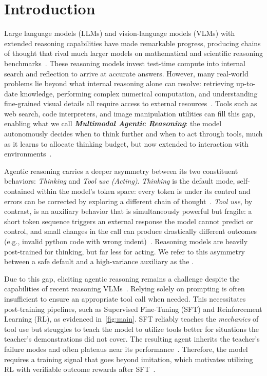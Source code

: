 \section{Introduction}
\label{sec:intro}

Large language models (LLMs) and vision-language models (VLMs) with extended reasoning capabilities have made remarkable progress, producing chains of thought that rival much larger models on mathematical and scientific reasoning benchmarks~\citep{r1, o1, s1}.
These reasoning models invest test-time compute into internal search and reflection to arrive at accurate answers.
However, many real-world problems lie beyond what internal reasoning alone can resolve: retrieving up-to-date knowledge, performing complex numerical computation, and understanding fine-grained visual details all require access to external resources~\citep{Search-R1, Search-o1, PoT, mini-o3, vstar}.
Tools such as web search, code interpreters, and image manipulation utilities can fill this gap, enabling what we call \textbf{\emph{Multimodal Agentic Reasoning}}: the model autonomously decides when to think further and when to act through tools, much as it learns to allocate thinking budget, but now extended to interaction with environments~\citep{AgenticReasoning, tora, TIR, pyvision, toolorchestra, visualsketchpad}.



Agentic reasoning carries a deeper asymmetry between its two constituent behaviors: \emph{Thinking} and \emph{Tool use (Acting)}.
\emph{Thinking} is the default mode, self-contained within the model's token space: every token is under its control and errors can be corrected by exploring a different chain of thought~\citep{R1-thoughtology,ahamoment,understandingreasoning}.
\emph{Tool use}, by contrast, is an auxiliary behavior that is simultaneously powerful but fragile: a short token sequence triggers an external response the model cannot predict or control, and small changes in the call can produce drastically different outcomes (e.g., invalid python code with wrong indent)~\citep{pyvision-rl}.
Reasoning models are heavily post-trained for thinking, but far less for acting.
We refer to this asymmetry between a safe default and a high-variance auxiliary as the \textbf{\emph{\gap}}. 

Due to this gap, eliciting agentic reasoning remains a challenge despite the  capabilities of recent reasoning VLMs~\citep{Qwen3VL}. Relying solely on prompting is often insufficient to ensure an appropriate tool call when needed. This necessitates post-training pipelines, such as Supervised Fine-Tuning (SFT) and Reinforcement Learning (RL), as evidenced in~\autoref{fig:main}.
SFT reliably teaches the \emph{mechanics} of tool use but struggles to teach the model to utilize tools better for situations the teacher's demonstrations did not cover. The resulting agent inherits the teacher's failure modes and often plateaus near its performance~\citep{AgentDistill, dagger}.
Therefore, the model requires a training signal that goes beyond imitation, which motivates utilizing RL with verifiable outcome rewards after SFT~\citep{pyvision-rl, AgenticReasoningRL, deepeyesv2}.

